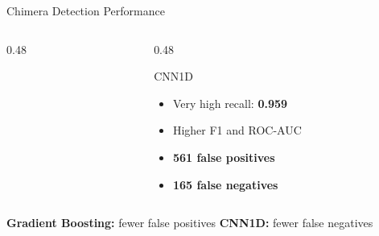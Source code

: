 \documentclass[aspectratio=169,11pt]{beamer}
\begin{document}
\begin{frame}{Chimera Detection Performance}
\begin{columns}[T,onlytextwidth]
\begin{column}{0.48\textwidth}
\end{column}



\begin{column}{0.48\textwidth}

\begin{block}{CNN1D}
\footnotesize

\begin{itemize}
    \setlength{\itemsep}{2pt}
    \setlength{\parskip}{0pt}

    \item Very high recall: \textbf{0.959}
    \item Higher F1 and ROC-AUC
    \item \textbf{561 false positives}
    \item \textbf{165 false negatives}

\end{itemize}

\end{block}

\end{column}

\end{columns}

\vspace{0.05cm}

\begin{center}
{\scriptsize\color{mitogray}
\textbf{Gradient Boosting:} fewer false positives
\qquad
\textbf{CNN1D:} fewer false negatives
}
\end{center}

\end{frame}


\end{document}
